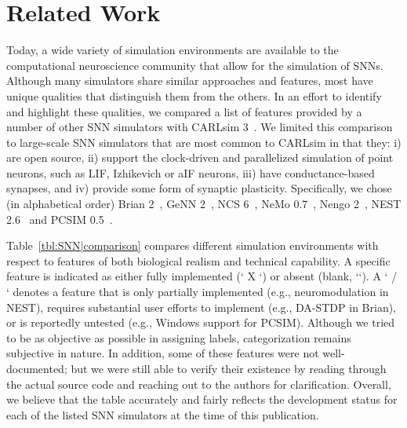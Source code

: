 \section{Related Work}

Today, a wide variety of simulation environments are
available to the computational neuroscience community that
allow for the simulation of \acp{SNN}. Although many simulators
share similar approaches and features, most have unique
qualities that distinguish them from the others. In an effort to
identify and highlight these qualities, we compared a list of
features provided by a number of other \ac{SNN} simulators with
CARLsim 3~\citep{Beyeler2015a}.
We limited this comparison to large-scale \ac{SNN}
simulators that are most common to CARLsim in that they: i)
are open source, ii) support the clock-driven and parallelized
simulation of point neurons, such as LIF, Izhikevich or aIF
neurons, iii) have conductance-based synapses, and iv)
provide some form of synaptic plasticity.
Specifically, we chose (in alphabetical order)
Brian 2~\citep{Goodman2008},
GeNN 2~\citep{Nowotny2011},
NCS 6~\citep{Hoang2013},
NeMo 0.7~\citep{Fidjeland2009},
Nengo 2~\citep{Bekolay2014},
NEST 2.6~\citep{Gewaltig2007} and
PCSIM 0.5~\citep{Pecevski2009}.

Table~\ref{tbl:SNN|comparison}
compares different simulation environments with
respect to features of both biological realism and technical
capability. A specific feature is indicated as either fully
implemented (` X `) or absent (blank, `\hspace{0.1in}`). A ` / ` denotes a
feature that is only partially implemented (e.g.,
neuromodulation in NEST), requires substantial user efforts to
implement (e.g., DA-\ac{STDP} in Brian), or is reportedly untested
(e.g., Windows support for PCSIM). Although we tried to be
as objective as possible in assigning labels, categorization
remains subjective in nature. In addition, some of these
features were not well-documented; but we were still able to
verify their existence by reading through the actual source
code and reaching out to the authors for clarification. Overall,
we believe that the table accurately and fairly reflects the
development status for each of the listed SNN simulators at
the time of this publication.

